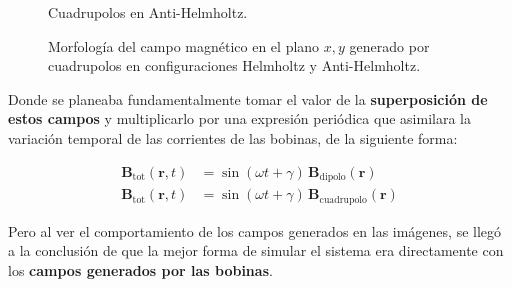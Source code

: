 \begin{figure}[H]
\begin{minipage}[b]{0.48\textwidth}
        \caption{Cuadrupolos en Anti-Helmholtz.}
        \label{fig:antihelmholtz_quadrupoles_xy_field}
    \end{minipage}
    \caption{Morfología del campo magnético en el plano $x,y$ generado por cuadrupolos en configuraciones Helmholtz y Anti-Helmholtz.}
    \label{fig:campos_cuadrupolos}
\end{figure}

Donde se planeaba fundamentalmente tomar el valor de la \textbf{superposición de estos campos} y multiplicarlo por una expresión periódica que asimilara la variación temporal de las corrientes de las bobinas, de la siguiente forma:

\begin{align*}
\mathbf{B}_{\text{tot}}(\mathbf{r},t) &= \sin(\omega t + \gamma) \, \mathbf{B}_{\text{dipolo}}(\mathbf{r}) \\
\mathbf{B}_{\text{tot}}(\mathbf{r},t) &= \sin(\omega t + \gamma) \, \mathbf{B}_{\text{cuadrupolo}}(\mathbf{r})
\end{align*}

Pero al ver el comportamiento de los campos generados en las imágenes, se llegó a la conclusión de que la mejor forma de simular el sistema era directamente con los \textbf{campos generados por las bobinas}.